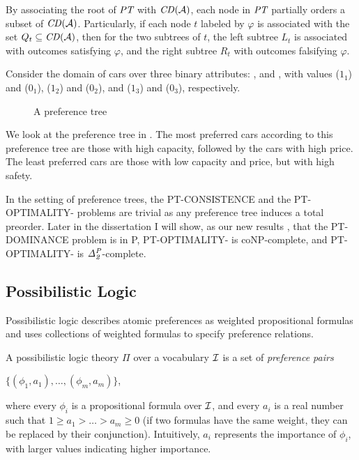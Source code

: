 By associating the root of $\textit{PT}$ with $\mathit{CD}(\mathcal{A})$,
each node in $\textit{PT}$ partially orders a subset of $\mathit{CD}(\mathcal{A})$.
Particularly, if each node $t$ labeled by $\varphi$ 
is associated with the set $Q_t \subseteq \mathit{CD}(\mathcal{A})$,
then for the two subtrees of $t$, the left subtree $L_t$
is associated with outcomes satisfying $\varphi$,
and the right subtree $R_t$ with outcomes falsifying $\varphi$.

Consider the domain of cars over three binary attributes:
,  and ,
with values  ($1_1$) and  ($0_1$),
 ($1_2$) and  ($0_2$), and
 ($1_3$) and  ($0_3$), respectively.

\begin{figure}[!ht]
  \centering
  \caption{A preference tree}
  \label{fig:fpt}
\end{figure}

We look at the preference tree in .
The most preferred cars according to this preference tree
are those with high capacity, followed by the cars with
high price.  The least preferred cars are those with
low capacity and price, but with high safety.

In the setting of preference trees, the PT-CONSISTENCE
and the PT-OPTIMALITY-
problems are trivial as any preference tree induces a
total preorder.
Later in the dissertation I will show, as our new results \cite{conf/adt15/liuT}, 
that the PT-DOMINANCE problem is in P, 
PT-OPTIMALITY- is coNP-complete,
and PT-OPTIMALITY- is $\mathit{\Delta^P_{2}}$-complete.


\subsection{Possibilistic Logic}
Possibilistic logic \cite{DuboisLP91} describes atomic preferences as weighted propositional
formulas and uses collections of weighted formulas to specify preference
relations.

A possibilistic logic theory $\Pi$ over a vocabulary $\mathcal{I}$ is a set of 
\emph{preference pairs}
\begin{center}
	$\{ (\phi_1,a_1), \ldots, (\phi_m,a_m) \}$,
\end{center}
where every $\phi_i$ is a propositional formula over $\mathcal{I}$, and every $a_i$ is a real number
such that $1\geq a_1>\ldots>a_m\geq 0$ (if two formulas have the same 
weight, they can be replaced by their conjunction).
Intuitively, $a_i$ represents the importance of $\phi_i$, with larger values
indicating higher importance.


